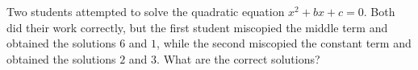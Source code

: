 Two students attempted to solve the quadratic equation $x^2+bx+c=0$. Both did their work correctly, but the first student miscopied the middle term and obtained the solutions $6$ and $1$, while the second miscopied the constant term and obtained the solutions $2$ and $3$. What are the correct solutions?
